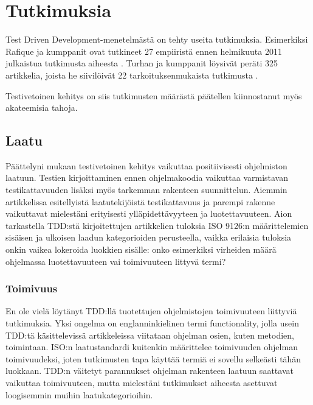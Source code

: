 \documentclass[finnish]{tktltiki2}
\theoremstyle{definition}
\theoremstyle{remark}
\begin{document}
\section{Tutkimuksia}

Test Driven Development-menetelmästä on tehty useita tutkimuksia. Esimerkiksi Rafique ja kumppanit ovat tutkineet 27 empiiristä ennen helmikuuta 2011 julkaistua tutkimusta aiheesta \cite{Rafique13}. Turhan ja kumppanit löysivät peräti 325 artikkelia, joista he siivilöivät 22 tarkoituksenmukaista tutkimusta \cite{Turhan10}. 

Testivetoinen kehitys on siis tutkimusten määrästä päätellen kiinnostanut myös akateemisia tahoja.




\subsection{Laatu}

Päättelyni mukaan testivetoinen kehitys vaikuttaa positiivisesti ohjelmiston laatuun. Testien kirjoittaminen ennen ohjelmakoodia vaikuttaa varmistavan testikattavuuden lisäksi myös tarkemman rakenteen suunnittelun. Aiemmin artikkelissa esitellyistä laatutekijöistä testikattavuus ja parempi rakenne vaikuttavat mielestäni erityisesti ylläpidettävyyteen ja luotettavuuteen. Aion tarkastella TDD:stä kirjoitettujen artikkelien tuloksia ISO 9126:n määrittelemien sisäisen ja ulkoisen laadun kategorioiden perusteella, vaikka erilaisia tuloksia onkin vaikea lokeroida luokkien sisälle: onko esimerkiksi virheiden määrä ohjelmassa luotettavuuteen vai toimivuuteen littyvä termi? 

\subsubsection{Toimivuus}

En ole vielä löytänyt TDD:llä tuotettujen ohjelmistojen toimivuuteen liittyviä tutkimuksia. Yksi ongelma on englanninkielinen termi functionality, jolla usein TDD:tä käsittelevissä artikkeleissa viitataan ohjelman osien, kuten metodien, toimintaan. ISO:n laatustandardi kuitenkin määrittelee toimivuuden ohjelman toimivuudeksi, joten tutkimusten tapa käyttää termiä ei sovellu selkeästi tähän luokkaan. TDD:n väitetyt parannukset ohjelman rakenteen laatuun saattavat vaikuttaa toimivuuteen, mutta mielestäni tutkimukset aiheesta asettuvat loogisemmin muihin laatukategorioihin.
\end{document}
